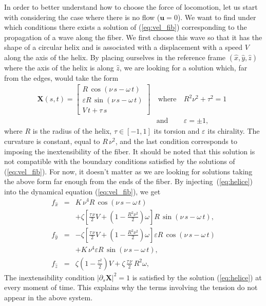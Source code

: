 \documentclass[aps,pre,reprint,superscriptaddress]{revtex4-2}
\begin{document}
In order to better understand how to choose the force of locomotion, let us start with considering the case where there is no flow ($\bm u = 0$). We want to find under which conditions there exists a solution of (\ref{eq:vel_fib}) corresponding to the propagation of a wave along the fiber. We first choose this wave so that it has the shape of a circular helix and is associated with a displacement with a speed $V$ along the axis of the helix. By placing ourselves in the reference frame $(\hat{x},\hat{y},\hat{z})$ where the axis of the helix is along $\hat{z}$, we are looking for a solution which, far from the edges, would take the form
\begin{eqnarray}
  \bm X(s,t) = \left[ \begin{array}{c} R\,\cos(\nu\,s-\omega\,t) \\ \varepsilon R\,\sin(\nu\,s-\omega\,t)\\  V\,t+\tau\,s\end{array}\right] &\ \mbox{where}& \ R^2\nu^2+\tau^2 = 1\ \ \nonumber\\ &\mbox{and}& \ \varepsilon = \pm 1 ,
  \label{eq:helice}
\end{eqnarray}
where $R$ is the radius of the helix, $\tau\in[-1,1]$ its torsion and $\varepsilon$ its chirality. The curvature is constant, equal to $R\,\nu^2$, and the last condition corresponds to imposing the inextensibility of the fiber. It should be noted that this solution is not compatible with the boundary conditions satisfied by the solutions of (\ref{eq:vel_fib}). For now, it doesn't matter as we are looking for solutions taking the above form far enough from the ends of the fiber. By injecting~(\ref{eq:helice}) into the dynamical equation (\ref{eq:vel_fib}), we get
\begin{eqnarray}
  f_{\hat{x}} &=& K\,\nu^4 R\,\cos(\nu\,s-\omega\,t) \nonumber\\
  &&+ \zeta \left[\frac{\tau\,\nu}{2}V+\left(1-\frac{R^2\nu^2}{2}\right) \omega\right]R\,\sin(\nu\,s-\omega\,t), \label{eq:fxtmp}\\
  f_{\hat{y}}&=& -\zeta \left[\frac{\tau\,\nu}{2}V+\left(1-\frac{R^2\nu^2}{2}\right) \omega\right]\varepsilon R\, \cos(\nu\,s-\omega\,t) \nonumber\\
  &&+K\,\nu^4 \varepsilon R\,\sin(\nu\,s-\omega\,t), \label{eq:fytmp}\\
   f_{\hat{z}} &=& \zeta\left(1-\frac{\tau^2}{2}\right)V +\zeta\,\frac{\tau\,\nu}{2}\,R^2\omega \label{eq:fztmp},
 \end{eqnarray}
The inextensibility condition $|\partial_s \bm X |^2 = 1$ is satisfied by the solution (\ref{eq:helice}) at every moment of time. This explains why the terms involving the tension do not appear in the above system.
\end{document}
